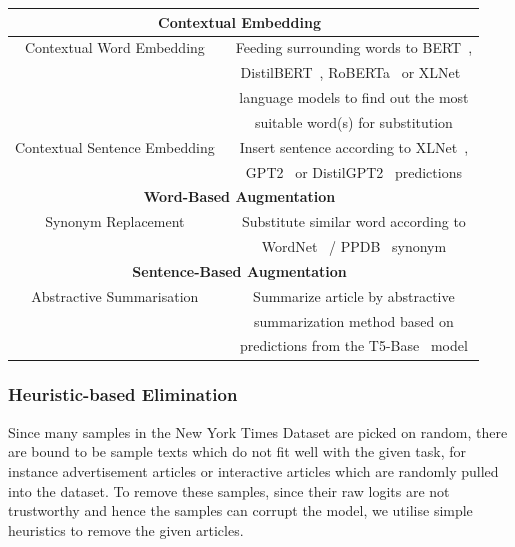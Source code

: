 \documentclass[12pt]{article}
\begin{document}
{\begin{center}
\begin{tabular}{|c|c|}
\hline \multicolumn{2}{|c|}{\textbf{Contextual Embedding}~\cite{contextual_embedding}} \\
\hline Contextual Word Embedding~\cite{contextual_word_embedding} & Feeding surrounding words to BERT~\cite{bert}, \\ & DistilBERT~\cite{distilbert}, RoBERTa~\cite{roberta} or XLNet~\cite{xlnet, xlnet_gen} \\ & language models to find out the most \\& suitable word(s) for substitution\\
\hline Contextual Sentence Embedding~\cite{contextual_sentence_embedding} & Insert sentence according to XLNet~\cite{xlnet, xlnet_gen},\\ & GPT2~\cite{gpt2, gpt2sentence} or DistilGPT2~\cite{distilgpt2} predictions \\
\hline \multicolumn{2}{|c|}{\textbf{Word-Based Augmentation~\cite{snysubmethod}}} \\
\hline Synonym Replacement~\cite{synonymaug} & Substitute similar word according to \\ & WordNet~\cite{wordnet, wordnetbook} / PPDB~\cite{ppdb, paraphrase} synonym \\
\hline \multicolumn{2}{|c|}{\textbf{Sentence-Based Augmentation~\cite{sentence_aug}}} \\
\hline Abstractive Summarisation~\cite{abstsumm} & Summarize article by abstractive \\& summarization method based on \\ & predictions from the T5-Base~\cite{transferlearningtext} model \\
\hline
\end{tabular}
\label{augmentationmethods}
\end{center}

\subsubsection{Heuristic-based Elimination}
Since many samples in the New York Times Dataset are picked on random, there are bound to be sample texts which do not fit well with the given task, for instance advertisement articles or interactive articles which are randomly pulled into the dataset. To remove these samples, since their raw logits are not trustworthy and hence the samples can corrupt the model, we utilise simple heuristics to remove the given articles.

}
\end{document}
